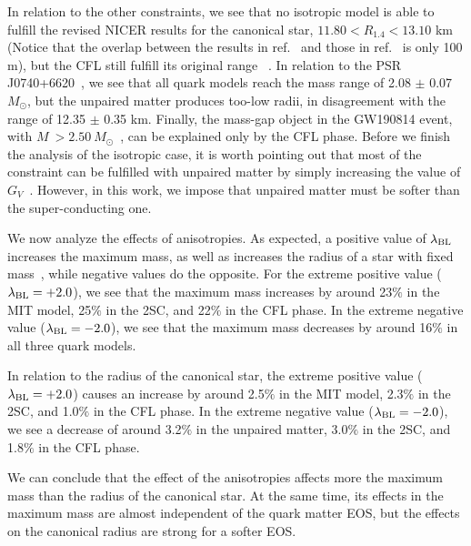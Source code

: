 \documentclass[%
reprint,
superscriptaddress,
nofootinbib,
amsmath,
amssymb,
aps,
floatfix,
showkeys,
]{revtex4-2}
\begin{document}
In relation to the other constraints, we see that no isotropic model is able to fulfill the revised NICER results for the canonical star, $11.80 <R_{1.4}< 13.10$ km ~\cite{Miller_2021} (Notice that the overlap between the results in ref.~\cite{Capano_2020} and those in ref.~\cite{Miller_2021} is only 100 m), but the CFL still fulfill its original range ~\cite{Riley_2019}. In relation to the  PSR J0740+6620~\cite{Miller_2021}, we see that all quark models reach the mass range  of 2.08 $\pm$ 0.07 $M_\odot$, but the unpaired matter produces  too-low radii, in disagreement with the range of 12.35 $\pm$ 0.35 km. Finally, the mass-gap object in the GW190814 event, with $M~>2.50~M_\odot$~\cite{RAbbott_2020}, can be explained only by the CFL phase. Before we finish the analysis of the isotropic case, it is worth pointing out that most of the constraint can be fulfilled with unpaired matter by simply increasing the value of $G_V$~\cite{Lopes_ApJ}. However, in this work, we impose that unpaired matter must be softer than the super-conducting one. 

We now analyze the effects of anisotropies. As expected, a positive value of $\lambda_{\rm BL}$ increases the maximum mass, as well as increases the radius of a star with fixed mass~\cite{Bowers_1974, Lopes2023M}, while negative values do the opposite. For the extreme positive value ($\lambda_{\rm BL} = +2.0$), we see that the maximum mass increases by around 23$\%$ in the MIT model, 25$\%$ in the 2SC, and 22$\%$ in the CFL phase.  In the extreme negative value ($\lambda_{\rm BL} = -2.0$), we see that the maximum mass decreases by around 16$\%$ in all three quark models.

In relation to the radius of the canonical star, the extreme positive value ($\lambda_{\rm BL} = +2.0$) causes an increase by around 2.5$\%$ in the MIT model, 2.3$\%$ in the 2SC, and 1.0$\%$ in the CFL phase. In the extreme negative value ($\lambda_{\rm BL} = -2.0$), we see a decrease of around 3.2$\%$ in the unpaired matter, 3.0$\%$ in the 2SC, and 1.8$\%$ in the CFL phase. 

We can conclude that the effect of the anisotropies affects more the maximum mass than the radius of the canonical star. At the same time, its effects in the maximum mass are almost independent of the quark matter EOS, but the effects on the canonical radius are strong for a softer EOS.
\end{document}
